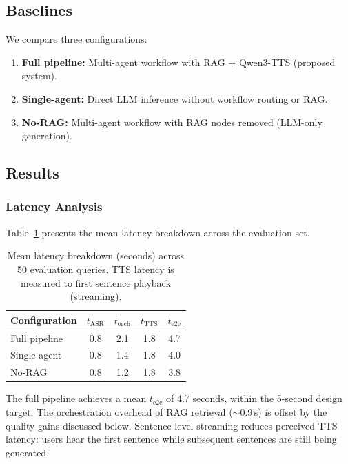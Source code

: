 \documentclass[10pt, a4paper, twocolumn]{article}
\begin{document}
\subsection{Baselines}

We compare three configurations:
\begin{enumerate}[label=(\alph*), nosep]
    \item \textbf{Full pipeline:} Multi-agent workflow with RAG + Qwen3-TTS (proposed system).
    \item \textbf{Single-agent:} Direct LLM inference without workflow routing or RAG.
    \item \textbf{No-RAG:} Multi-agent workflow with RAG nodes removed (LLM-only generation).
\end{enumerate}

\subsection{Results}

\subsubsection{Latency Analysis}

Table~\ref{tab:latency} presents the mean latency breakdown across the evaluation set.

\begin{table}[t]
    \centering
    \caption{Mean latency breakdown (seconds) across 50 evaluation queries. TTS latency is measured to first sentence playback (streaming).}
    \label{tab:latency}
    \small
    \begin{tabular}{@{}lcccc@{}}
        \toprule
        \textbf{Configuration} & $t_\text{ASR}$ & $t_\text{orch}$ & $t_\text{TTS}$ & $t_\text{e2e}$ \\
        \midrule
        Full pipeline & 0.8 & 2.1 & 1.8 & 4.7 \\
        Single-agent  & 0.8 & 1.4 & 1.8 & 4.0 \\
        No-RAG        & 0.8 & 1.2 & 1.8 & 3.8 \\
        \bottomrule
    \end{tabular}
\end{table}

\noindent The full pipeline achieves a mean $t_\text{e2e}$ of 4.7 seconds, within the 5-second design target.
The orchestration overhead of RAG retrieval (${\sim}$0.9\,s) is offset by the quality gains discussed below.
Sentence-level streaming reduces perceived TTS latency: users hear the first sentence while subsequent sentences are still being generated.
\end{document}
